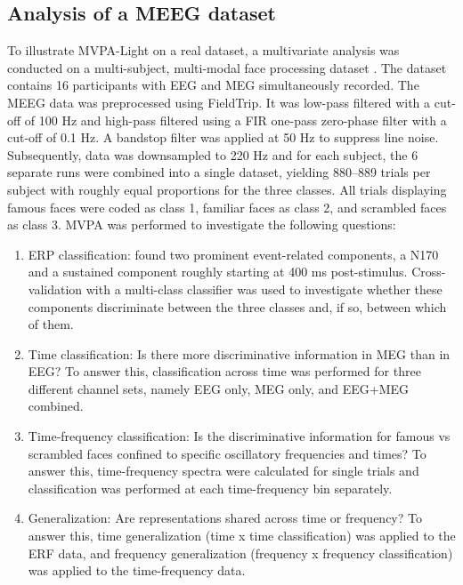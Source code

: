 \documentclass[utf8]{frontiersSCNS} %
\begin{document}
\subsection{Analysis of a MEEG dataset}

To illustrate MVPA-Light on a real dataset, a multivariate analysis was conducted on a multi-subject, multi-modal face processing dataset \citep{Wakeman2015ADataset,Wakeman2014OpenfMRI}. The dataset contains 16 participants with EEG and MEG simultaneously recorded. The MEEG data was preprocessed using FieldTrip. It was low-pass filtered with a cut-off of 100 Hz and high-pass filtered using a FIR one-pass zero-phase filter with a cut-off of 0.1 Hz. A bandstop filter was applied at 50 Hz to suppress line noise. Subsequently, data was downsampled to 220 Hz and for each subject, the 6 separate runs were combined into a single dataset, yielding 880--889 trials per subject with roughly equal proportions for the three classes. All trials displaying famous faces were coded as class 1, familiar faces as class 2, and scrambled faces as class 3. MVPA was performed to investigate the following questions:

\begin{enumerate}
    \item ERP classification: \cite{Wakeman2015ADataset} found two prominent event-related components, a N170 and a sustained component roughly starting at 400 ms post-stimulus. Cross-validation with a multi-class classifier was used to investigate whether these components discriminate between the three classes and, if so, between which of them.
    \item Time classification: Is there more discriminative information in MEG than in EEG? To answer this, classification across time was performed for three different channel sets, namely EEG only, MEG only, and EEG+MEG combined.
    \item Time-frequency classification: Is the discriminative information for famous vs scrambled faces confined to specific oscillatory frequencies and times? To answer this, time-frequency spectra were calculated for single trials and classification was performed at each time-frequency bin separately.
    \item Generalization: Are representations shared across time \citep{King2014} or frequency? To answer this, time generalization (time x time classification) was applied to the ERF data, and frequency generalization (frequency x frequency classification) was applied to the time-frequency data.
\end{enumerate}
\end{document}
